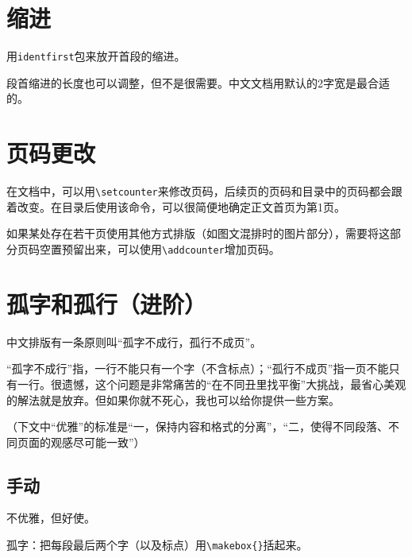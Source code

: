 \documentclass[10pt,openany]{book}
\begin{document}
\begin{sloppypar}


\section{缩进}

用\texttt{identfirst}包来放开首段的缩进。



段首缩进的长度也可以调整，但不是很需要。中文文档用默认的2字宽是最合适的。



\section{页码更改}

在文档中，可以用\texttt{\textbackslash{}setcounter}来修改页码，后续页的页码和目录中的页码都会跟着改变。在目录后使用该命令，可以很简便地确定正文首页为第1页。



如果某处存在若干页使用其他方式排版（如图文混排时的图片部分），需要将这部分页码空置预留出来，可以使用\texttt{\textbackslash{}addcounter}增加页码。



\section{孤字和孤行（进阶）}

中文排版有一条原则叫“孤字不成行，孤行不成页”。

“孤字不成行”指，一行不能只有一个字（不含标点）；“孤行不成页”指一页不能只有一行。很遗憾，这个问题是非常痛苦的“在不同丑里找平衡”大挑战，最省心美观的解法就是放弃。但如果你就不死心，我也可以给你提供一些方案。

（下文中“优雅”的标准是“一，保持内容和格式的分离”，“二，使得不同段落、不同页面的观感尽可能一致”）

\subsection{手动}

不优雅，但好使。

孤字：把每段最后两个字（以及标点）用\texttt{\textbackslash{}makebox\{\}}括起来。


\end{sloppypar}
\end{document}
